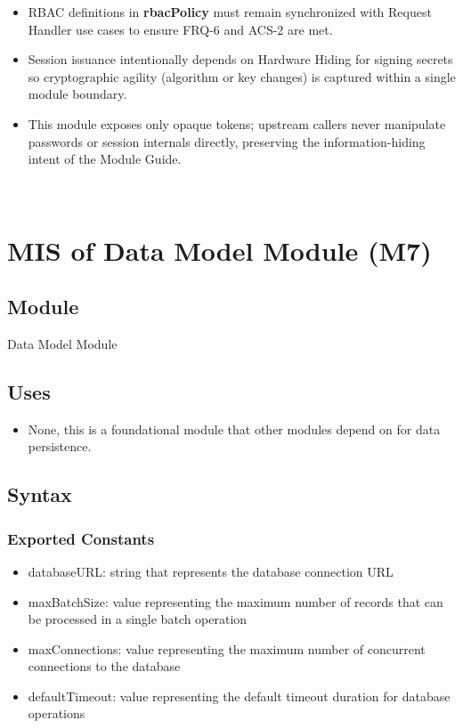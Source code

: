 \documentclass[12pt, titlepage]{article}
\begin{document}
\begin{itemize}
  \item RBAC definitions in \textbf{rbacPolicy} must remain synchronized with Request Handler use cases to ensure FRQ-6 and ACS-2 are met.
  \item Session issuance intentionally depends on Hardware Hiding for signing secrets so cryptographic agility (algorithm or key changes) is captured within a single module boundary.
  \item This module exposes only opaque tokens; upstream callers never manipulate passwords or session internals directly, preserving the information-hiding intent of the Module Guide.
\end{itemize}

~\newpage

\section{MIS of Data Model Module (M7)} \label{DataModelModule}

\subsection{Module}

Data Model Module

\subsection{Uses}

\begin{itemize}
  \item None, this is a foundational module that other modules depend on for data persistence.
\end{itemize}

\subsection{Syntax}

\subsubsection{Exported Constants}

\begin{itemize}
  \item databaseURL: string that represents the database connection URL
  \item maxBatchSize: value representing the maximum number of records that can be processed in a single batch operation
  \item maxConnections: value representing the maximum number of concurrent connections to the database
  \item defaultTimeout: value representing the default timeout duration for database operations
\end{itemize}
\end{document}
